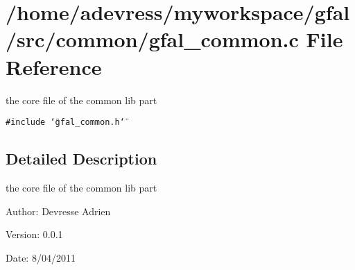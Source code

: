 \section{/home/adevress/myworkspace/gfal/src/common/gfal\_\-common.c File Reference}
\label{gfal__common_8c}
the core file of the common lib part 

{\tt \#include \char`\"{}gfal\_\-common.h\char`\"{}}\par


\subsection{Detailed Description}
the core file of the common lib part 

\begin{Desc}
\item[Author:]Devresse Adrien \end{Desc}
\begin{Desc}
\item[Version:]0.0.1 \end{Desc}
\begin{Desc}
\item[Date:]8/04/2011 \end{Desc}
